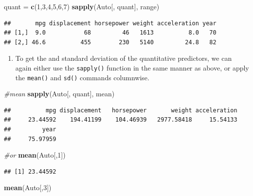 \documentclass[]{article}
\newenvironment{Shaded}{\begin{snugshade}}{\end{snugshade}}
\newcommand{\KeywordTok}[1]{\textcolor[rgb]{0.13,0.29,0.53}{\textbf{#1}}}
\newcommand{\DecValTok}[1]{\textcolor[rgb]{0.00,0.00,0.81}{#1}}
\newcommand{\StringTok}[1]{\textcolor[rgb]{0.31,0.60,0.02}{#1}}
\newcommand{\CommentTok}[1]{\textcolor[rgb]{0.56,0.35,0.01}{\textit{#1}}}
\newcommand{\NormalTok}[1]{#1}
\providecommand{\tightlist}{%
  \setlength{\itemsep}{0pt}\setlength{\parskip}{0pt}}
\begin{document}
\begin{Shaded}
\begin{Highlighting}[]
\NormalTok{quant =}\StringTok{ }\KeywordTok{c}\NormalTok{(}\DecValTok{1}\NormalTok{,}\DecValTok{3}\NormalTok{,}\DecValTok{4}\NormalTok{,}\DecValTok{5}\NormalTok{,}\DecValTok{6}\NormalTok{,}\DecValTok{7}\NormalTok{)}
\KeywordTok{sapply}\NormalTok{(Auto[, quant], range)}
\end{Highlighting}
\end{Shaded}

\begin{verbatim}
##       mpg displacement horsepower weight acceleration year
## [1,]  9.0           68         46   1613          8.0   70
## [2,] 46.6          455        230   5140         24.8   82
\end{verbatim}

\begin{enumerate}
\def\labelenumi{\alph{enumi})}
\setcounter{enumi}{2}
\tightlist
\item
  To get the and standard deviation of the quantitative predictors, we
  can again either use the \texttt{sapply()} function in the same manner
  as above, or apply the \texttt{mean()} and \texttt{sd()} commands
  columnwise.
\end{enumerate}

\begin{Shaded}
\begin{Highlighting}[]
\CommentTok{#mean}
\KeywordTok{sapply}\NormalTok{(Auto[, quant], mean)}
\end{Highlighting}
\end{Shaded}

\begin{verbatim}
##          mpg displacement   horsepower       weight acceleration 
##     23.44592    194.41199    104.46939   2977.58418     15.54133 
##         year 
##     75.97959
\end{verbatim}

\begin{Shaded}
\begin{Highlighting}[]
\CommentTok{#or}
\KeywordTok{mean}\NormalTok{(Auto[,}\DecValTok{1}\NormalTok{])}
\end{Highlighting}
\end{Shaded}

\begin{verbatim}
## [1] 23.44592
\end{verbatim}

\begin{Shaded}
\begin{Highlighting}[]
\KeywordTok{mean}\NormalTok{(Auto[,}\DecValTok{3}\NormalTok{])}
\end{Highlighting}
\end{Shaded}
\end{document}
